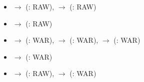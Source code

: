 \begin{itemize}
\item {} $\rightarrow$  (: RAW), 
       $\rightarrow$  (: RAW)
\item {} $\rightarrow$  (: RAW)
\item {} $\rightarrow$  (: WAR), 
       $\rightarrow$  (: WAR), 
       $\rightarrow$  (: WAR)
\item {} $\rightarrow$  (: WAR)
\item {} $\rightarrow$  (: RAW), 
       $\rightarrow$  (: WAR)
\end{itemize}
